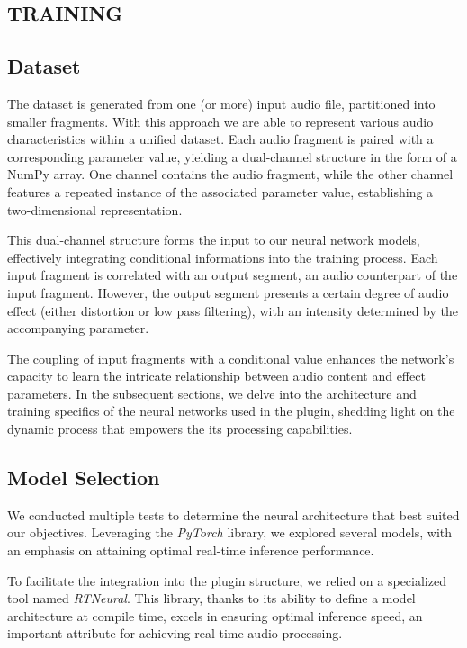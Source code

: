 \documentclass{article}
\begin{document}
\begin{sloppy}
\section{TRAINING}
\label{sec:training}

\subsection{Dataset}
\label{ssec:dataset}
The dataset is generated from one (or more) input audio file, partitioned into smaller fragments. With this approach we are able to represent various audio characteristics within a unified dataset. Each audio fragment is paired with a corresponding parameter value, yielding a dual-channel structure in the form of a NumPy array. One channel contains the audio fragment, while the other channel features a repeated instance of the associated parameter value, establishing a two-dimensional representation.

This dual-channel structure forms the input to our neural network models, effectively integrating conditional informations into the training process. Each input fragment is correlated with an output segment, an audio counterpart of the input fragment. However, the output segment presents a certain degree of audio effect (either distortion or low pass filtering), with an intensity determined by the accompanying parameter.

The coupling of input fragments with a conditional value enhances the network's capacity to learn the intricate relationship between audio content and effect parameters. In the subsequent sections, we delve into the architecture and training specifics of the neural networks used in the plugin, shedding light on the dynamic process that empowers the its processing capabilities.

\subsection{Model Selection}
\label{ssec:modelSel}

We conducted multiple tests to determine the neural architecture that best suited our objectives. Leveraging the \emph{PyTorch} library, we explored several models, with an emphasis on attaining optimal real-time inference performance. 

To facilitate the integration into the plugin structure, we relied on a specialized tool named \emph{RTNeural}. This library, thanks to its ability to define a model architecture at compile time, excels in ensuring optimal inference speed, an important attribute for achieving real-time audio processing.


\end{sloppy}
\end{document}
